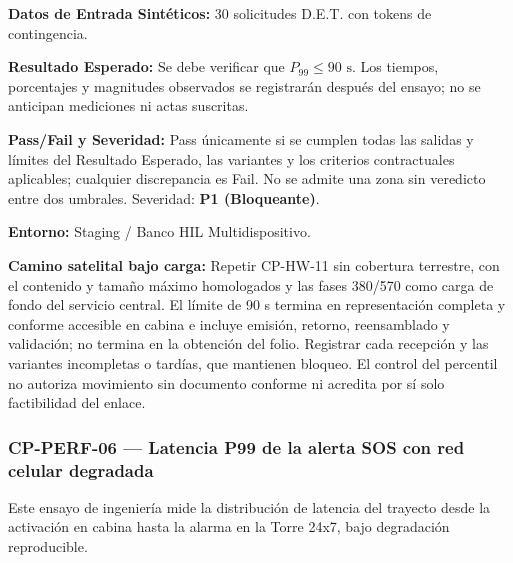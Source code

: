 \par\noindent \textbf{Datos de Entrada Sintéticos:} 30 solicitudes D.E.T. con tokens de contingencia.\par
\par\noindent \textbf{Resultado Esperado:} Se debe verificar que $P_{99} \le 90\text{ s}$. Los tiempos, porcentajes y magnitudes observados se registrarán después del ensayo; no se anticipan mediciones ni actas suscritas.\par
\par\noindent \textbf{Pass/Fail y Severidad:} Pass únicamente si se cumplen todas las salidas y límites del Resultado Esperado, las variantes y los criterios contractuales aplicables; cualquier discrepancia es Fail. No se admite una zona sin veredicto entre dos umbrales. Severidad: \textbf{P1 (Bloqueante)}.\par
\par\noindent \textbf{Entorno:} Staging / Banco HIL Multidispositivo.\par



\par\noindent\textbf{Camino satelital bajo carga:} Repetir CP-HW-11 sin cobertura terrestre, con el contenido y tamaño máximo homologados y las fases 380/570 como carga de fondo del servicio central. El límite de 90 s termina en representación completa y conforme accesible en cabina e incluye emisión, retorno, reensamblado y validación; no termina en la obtención del folio. Registrar cada recepción y las variantes incompletas o tardías, que mantienen bloqueo. El control del percentil no autoriza movimiento sin documento conforme ni acredita por sí solo factibilidad del enlace.\par


\subsubsection*{CP-PERF-06 — Latencia P99 de la alerta SOS con red celular degradada}\label{sec:9-cp-perf-06}
Este ensayo de ingeniería mide la distribución de latencia del trayecto desde la activación en cabina hasta la alarma en la Torre 24x7, bajo degradación reproducible.

